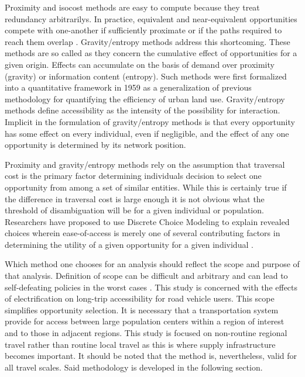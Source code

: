 Proximity and isocost methods are easy to compute because they treat redundancy arbitrarilys. In practice, equivalent and near-equivalent opportunities compete with one-another if sufficiently proximate or if the paths required to reach them overlap \cite{Stouffer_1940}. Gravity/entropy methods \cite{Noulas_2012, Jung_2008} address this shortcoming. These methods are so called as they concern the cumulative effect of opportunities for a given origin. Effects can accumulate on the basis of demand over proximity (gravity) or information content (entropy). Such methods were first formalized into a quantitative framework in 1959 \cite{Hansen_1959} as a generalization of previous methodology for quantifying the efficiency of urban land use. Gravity/entropy methods define accessibility as the intensity of the possibility for interaction. Implicit in the formulation of gravity/entropy methods is that every opportunity has some effect on every individual, even if negligible, and the effect of any one opportunity is determined by its network position.

Proximity and gravity/entropy methods rely on the assumption that traversal cost is the primary factor determining individuals decision to select one opportunity from among a set of similar entities. While this is certainly true if the difference in traversal cost is large enough it is not obvious what the threshold of disambiguation will be for a given individual or population. Researchers have proposed to use Discrete Choice Modeling \cite{Ben_Akiva_1985} to explain revealed choices wherein ease-of-access is merely one of several contributing factors in determining the utility of a given opportunity for a given individual \cite{Cevero_1995, Shen_1998, Karst_2003}.

Which method one chooses for an analysis should reflect the scope and purpose of that analysis. Definition of scope can be difficult and arbitrary and can lead to self-defeating policies in the worst cases \cite{Handy_1996}. This study is concerned with the effects of electrification on long-trip accessibility for road vehicle users. This scope simplifies opportunity selection. It is necessary that a transportation system provide for access between large population centers within a region of interest and to those in adjacent regions. This study is focused on non-routine regional travel rather than routine local travel as this is where supply infrastructure becomes important. It should be noted that the method is, nevertheless, valid for all travel scales. Said methodology is developed in the following section.